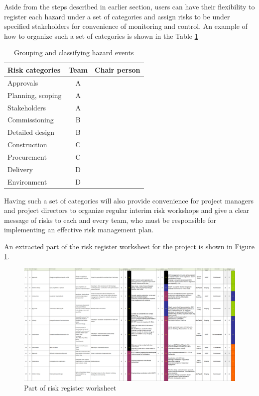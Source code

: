\documentclass[10pt,halfline,a4paper]{ouparticle}
\begin{document}
Aside from the steps described in earlier section, users can have their flexibility to register each hazard under a set of categories and assign risks to be under specified stakeholders for convenience of monitoring and control. An example of how to organize such a set of categories is shown in the Table \ref{tbl_categories}
\begin{table}
\centering
\caption{Grouping and classifying hazard events}
\begin{tabular}{l|l|l}
\hline
Risk categories & \multicolumn{1}{c|}{Team} & Chair person \\ 
\hline
Approvals & \multicolumn{1}{c|}{A} &  \\ 
Planning, scoping & \multicolumn{1}{c|}{A} &  \\ 
Stakeholders & \multicolumn{1}{c|}{A} &  \\ 
Commissioning & \multicolumn{1}{c|}{B} &  \\ 
Detailed design & \multicolumn{1}{c|}{B} &  \\ 
Construction & \multicolumn{1}{c|}{C} &  \\ 
Procurement & \multicolumn{1}{c|}{C} &  \\ 
Delivery & \multicolumn{1}{c|}{D} &  \\ 
Environment & \multicolumn{1}{c|}{D} &  \\ 
\hline
\end{tabular}
\label{tbl_categories}
\end{table}
Having such a set of categories will also provide convenience for project managers and project directors to organize regular interim risk workshops and give a clear message of risks to each and every team, who must be responsible for implementing an effective risk management plan.

An extracted part of the risk register worksheet for the project is shown in Figure \ref{fig_riskregister}.


\begin{figure}
\centering \includegraphics[scale=0.2]{riskregister} \caption{Part of risk register worksheet}
\label{fig_riskregister} 
\end{figure}
\end{document}
